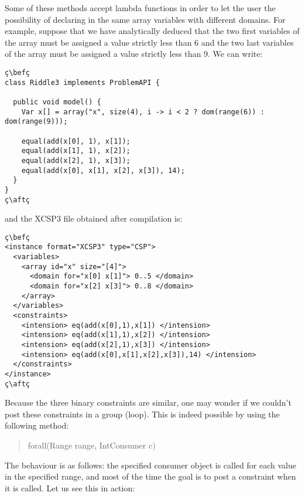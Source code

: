 \documentclass[10pt]{article}
\def\xt{{\rm XCSP3}\xspace}
\def\xt{{\rm XCSP3}\xspace}
\newenvironment{myvb}{\endgraf\small\verbatim}{\endverbatim}
\def\bef{\rule{10cm}{0.1mm}} %
\def\aft{\rule{10cm}{0.1mm}\medskip}
\begin{document}
Some of these methods accept lambda functions in order to let the user the possibility of declaring in the same array variables with different domains.
For example, suppose that we have analytically deduced that the two first variables of the array must be assigned a value strictly less than 6 and the two last variables of the array must be assigned a value strictly less than 9.
We can write:

\begin{lstlisting}
ç\befç
class Riddle3 implements ProblemAPI {

  public void model() {
    Var x[] = array("x", size(4), i -> i < 2 ? dom(range(6)) : dom(range(9)));
    
    equal(add(x[0], 1), x[1]);
    equal(add(x[1], 1), x[2]);
    equal(add(x[2], 1), x[3]);
    equal(add(x[0], x[1], x[2], x[3]), 14);
  }
}
ç\aftç
\end{lstlisting}
and the \xt file obtained after compilation is:
\begin{lstlisting}
ç\befç
<instance format="XCSP3" type="CSP">
  <variables>
    <array id="x" size="[4]">
      <domain for="x[0] x[1]"> 0..5 </domain>
      <domain for="x[2] x[3]"> 0..8 </domain>
    </array>
  </variables>
  <constraints>
    <intension> eq(add(x[0],1),x[1]) </intension>
    <intension> eq(add(x[1],1),x[2]) </intension>
    <intension> eq(add(x[2],1),x[3]) </intension>
    <intension> eq(add(x[0],x[1],x[2],x[3]),14) </intension>
  </constraints>
</instance>
ç\aftç
\end{lstlisting}

Because the three binary constraints are similar, one may wonder if we couldn't post these constraints in a group (loop).
This is indeed possible by using the following method:

\begin{quote}
\begin{myvb}
forall(Range range, IntConsumer c) 
\end{myvb}
\end{quote}


The behaviour is as follows: the specified consumer object is called for each value in the specified range, and most of the time the goal is to post a constraint when it is called.
Let us see this in action:
\end{document}
